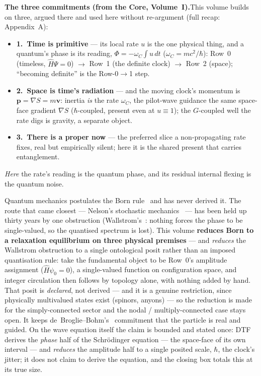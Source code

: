 \documentclass[11pt]{article}
\begin{document}
\smallskip
{}

\bigskip

\begin{tcolorbox}[keybox]
\textbf{The three commitments (from the Core, Volume~I).}\enspace This volume builds on three, argued there
and used here without re-argument (full recap: Appendix~A):
\begin{itemize}[leftmargin=1.4em,itemsep=1pt,topsep=3pt]
  \item \textbf{1.\ Time is primitive} --- its local rate $u$ is the one physical thing, and a quantum's
    phase is its reading, $\Phi=-\omega_C\!\int u\,dt$ ($\omega_C=mc^2/\hbar$): Row~0 (timeless,
    $\hat H\Psi=0$) $\to$ Row~1 (the definite clock) $\to$ Row~2 (space); ``becoming definite'' is the
    Row-0$\to$1 step.
  \item \textbf{2.\ Space is time's radiation} --- and the moving clock's momentum is
    $\mathbf p=\nabla S=m\mathbf v$: inertia \emph{is} the rate $\omega_C$, the pilot-wave guidance the same
    space-face gradient $\nabla S$ ($\hbar$-coupled, present even at $u\equiv1$); the $G$-coupled well the
    rate digs is gravity, a separate object.
  \item \textbf{3.\ There is a proper now} --- the preferred slice a non-propagating rate fixes, real but
    empirically silent; here it is the shared present that carries entanglement.
\end{itemize}
\noindent\emph{Here} the rate's reading is the quantum phase, and its residual internal flexing is the
quantum noise.
\end{tcolorbox}

\medskip
\noindent Quantum mechanics postulates the Born rule~\cite{Born1926} and has never derived it. The route
that came closest --- Nelson's stochastic mechanics~\cite{Nelson1966} --- has been held up thirty years by
one obstruction (Wallstrom's~\cite{Wallstrom1994}: nothing forces the phase to be single-valued, so the
quantised spectrum is lost). This volume \textbf{reduces Born to a relaxation equilibrium on three
physical premises} --- and \emph{reduces} the Wallstrom obstruction to a single ontological posit rather
than an imposed quantisation rule: take the fundamental object to be Row~0's amplitude assignment
($\hat H\psi_0=0$), a single-valued function on configuration space, and integer circulation then follows
by topology alone, with nothing added by hand. That posit is \emph{declared}, not derived --- and it is a
genuine restriction, since physically multivalued states exist (spinors, anyons) --- so the reduction is
made for the simply-connected sector and the nodal / multiply-connected case stays open. It keeps de~Broglie--Bohm's~\cite{Bohm1952}
commitment that the particle is real and guided. On the wave equation itself the claim is bounded and
stated once: DTF derives the \emph{phase} half of the Schr\"odinger equation --- the space-face of its own
interval --- and \emph{reduces} the amplitude half to a single posited scale, $\hbar$, the clock's jitter;
it does not claim to derive the equation, and the closing box totals this at its true size.
\end{document}
